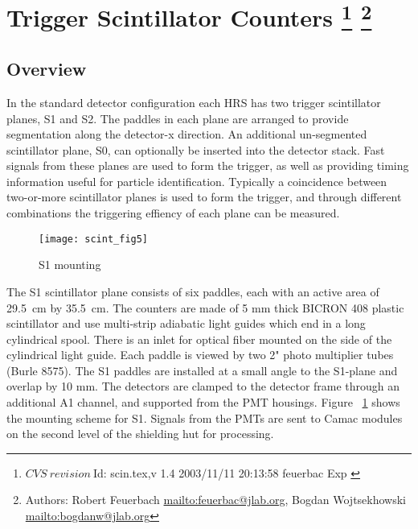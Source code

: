 
\section[Trigger Scintillator Counters]{Trigger Scintillator Counters
  \footnote{
    $CVS~revision~ $Id: scin.tex,v 1.4 2003/11/11 20:13:58 feuerbac Exp $ $
  }
  \footnote{Authors: Robert Feuerbach \url{mailto:feuerbac@jlab.org},
    Bogdan Wojtsekhowski \url{mailto:bogdanw@jlab.org}}
}
\subsection{Overview}

\newcommand{\unit}[1]{\,\mbox{\ensuremath{\mathrm{#1}}}}

In the standard detector configuration each HRS has two trigger
scintillator planes, S1 and S2. The paddles in each plane are arranged to
provide segmentation along the detector-x direction. An additional
un-segmented scintillator plane, S0, can 
optionally be inserted into the detector stack. Fast signals from
these planes are used to form the trigger, as well as providing timing
information useful for particle identification.  Typically a coincidence between
two-or-more scintillator planes is used to form the trigger, and
through different combinations the triggering effiency of each plane can
be measured.

\begin{figure}[tbh]
  \begin{center}
    \texttt{[image: scint\_fig5]}
    \caption[Detectors: S1 Mounting]{S1 mounting}
    
    \label{fig:s1mount}
  \end{center}
\end{figure}
The S1 scintillator plane consists of six paddles, each with an active area
of 29.5~cm by 35.5~cm. The counters are made of 5 mm thick BICRON 408
plastic scintillator and use multi-strip adiabatic light guides which end
in a long cylindrical spool. There is an inlet for optical fiber mounted on
the side of the cylindrical light guide. Each paddle is viewed by two 2"
photo multiplier tubes (Burle 8575).  The S1 paddles are installed at a
small angle to the S1-plane and overlap by 10 mm.  The detectors are
clamped to the detector frame through an additional A1 channel, and
supported from the PMT housings. Figure ~\ref{fig:s1mount} shows the
mounting scheme for S1. Signals from the PMTs are sent to Camac modules on
the second level of the shielding hut for processing.

